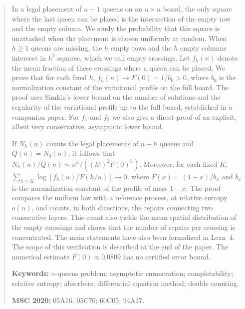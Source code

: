 \begin{abstract} \noindent In a legal placement of $n-1$ queens on an $n\times n$ board, the only square
where the last queen can be placed is
the intersection of the empty row and the empty column. We study the probability that this square is
unattacked when the placement is
chosen uniformly at random. When $h\ge1$ queens are missing, the $h$ empty rows and the $h$ empty columns
intersect in $h^2$ squares,
which we call empty crossings. Let $f_h(n)$ denote the mean fraction of these crossings where a queen can be
placed. We prove that for
each fixed $h$, $f_h(n)\to F(0)=1/b_0>0$, where $b_0$ is the normalization constant of the variational
profile on the full board. The
proof uses Simkin's lower bound on the number of solutions and the regularity of the variational profile up
to the full
board, established in a companion paper. For $f_1$ and $f_2$ we also give a direct proof of an explicit,
albeit very conservative,
asymptotic lower bound.

\smallskip\noindent If $N_h(n)$ counts the legal placements of $n-h$ queens and $Q(n)=N_0(n)$, it follows
that $N_h(n)/Q(n)\sim n^h/((h!)^2F(0)^h)$.
Moreover, for each fixed $K$, $\sum_{h\le K}\log[f_h(n)/F(h/n)]\to0$, where $F(x)=(1-x)/b_x$ and $b_x$ is
the normalization constant of
the profile of mass $1-x$. The proof compares the uniform law with a reference process, at relative entropy
$o(n)$, and counts, in
both directions, the repairs connecting two consecutive layers. This count also yields the mean spatial
distribution of the empty
crossings and shows that the number of repairs per crossing is concentrated. \ifverificacionLean The main
statements have also been
formalized in Lean~4. The scope of this verification is described at the end of the paper. \fi The numerical
estimate
$F(0)\approx0.0809$ has no certified error bound.

\medskip\noindent \textbf{Keywords:} $n$-queens problem; asymptotic enumeration; completability; relative
entropy; absorbers;
differential equation method; double counting.

\noindent \textbf{MSC 2020:} 05A16; 05C70; 60C05; 94A17. \end{abstract}
